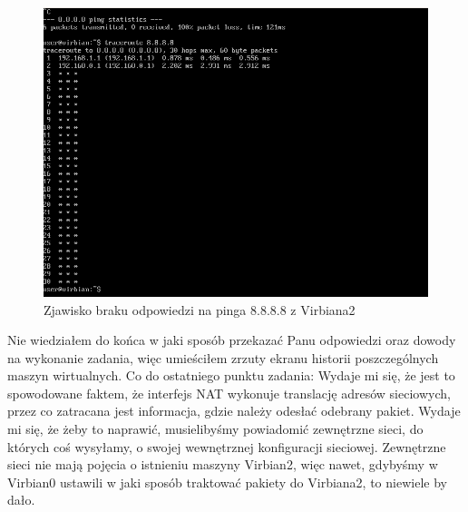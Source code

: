\documentclass[a4paper]{scrartcl}
\begin{document}
\begin{figure}
  \includegraphics[width=\linewidth]{hw3.png}
  \caption{Zjawisko braku odpowiedzi na pinga 8.8.8.8 z Virbiana2}
  \label{fig:error}
\end{figure}
Nie wiedziałem do końca w jaki sposób przekazać Panu odpowiedzi oraz dowody na wykonanie zadania, więc umieściłem zrzuty ekranu historii poszczególnych maszyn wirtualnych. Co do ostatniego punktu zadania: Wydaje mi się, że jest to spowodowane faktem, że interfejs NAT wykonuje translację adresów sieciowych, przez co zatracana jest informacja, gdzie należy odesłać odebrany pakiet. Wydaje mi się, że żeby to naprawić, musielibyśmy powiadomić zewnętrzne sieci, do których coś wysyłamy, o swojej wewnętrznej konfiguracji sieciowej. Zewnętrzne sieci nie mają pojęcia o istnieniu maszyny Virbian2, więc nawet, gdybyśmy w Virbian0 ustawili w jaki sposób traktować pakiety do Virbiana2, to niewiele by dało.
\end{document}
